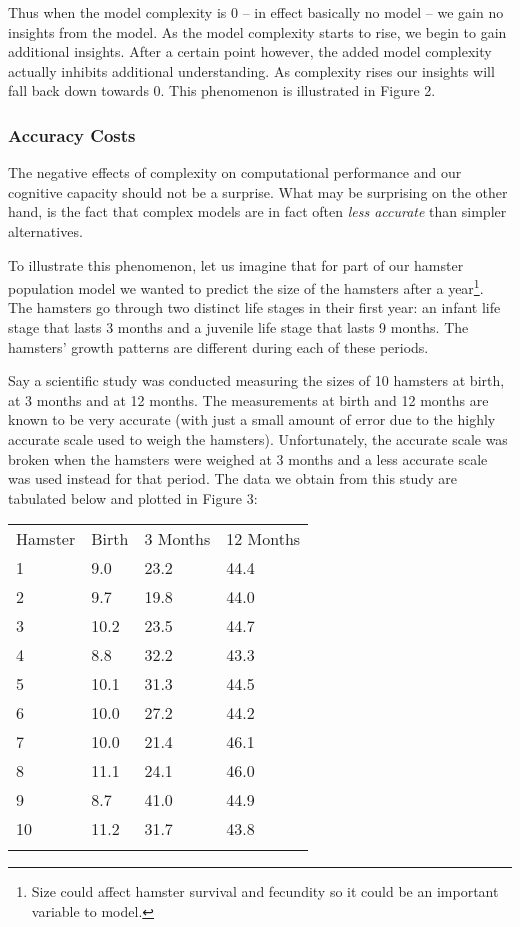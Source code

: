 \documentclass[]{memoir}
\begin{document}
Thus when the model complexity is 0 -- in effect basically no model --
we gain no insights from the model. As the model complexity starts to
rise, we begin to gain additional insights. After a certain point
however, the added model complexity actually inhibits additional
understanding. As complexity rises our insights will fall back down
towards 0. This phenomenon is illustrated in Figure 2.

\subsubsection{Accuracy Costs}

The negative effects of complexity on computational performance and our
cognitive capacity should not be a surprise. What may be surprising on
the other hand, is the fact that complex models are in fact often
\emph{less accurate} than simpler alternatives.

To illustrate this phenomenon, let us imagine that for part of our
hamster population model we wanted to predict the size of the hamsters
after a year\footnote{Size could affect hamster survival and fecundity
  so it could be an important variable to model.}. The hamsters go
through two distinct life stages in their first year: an infant life
stage that lasts 3 months and a juvenile life stage that lasts 9 months.
The hamsters' growth patterns are different during each of these
periods.

Say a scientific study was conducted measuring the sizes of 10 hamsters
at birth, at 3 months and at 12 months. The measurements at birth and 12
months are known to be very accurate (with just a small amount of error
due to the highly accurate scale used to weigh the hamsters).
Unfortunately, the accurate scale was broken when the hamsters were
weighed at 3 months and a less accurate scale was used instead for that
period. The data we obtain from this study are tabulated below and
plotted in Figure 3:

\begin{longtable}[c]{@{}llll@{}}
\hline\noalign{\medskip}
Hamster & Birth & 3 Months & 12 Months
\\\noalign{\medskip}
\hline\noalign{\medskip}
1 & 9.0 & 23.2 & 44.4
\\\noalign{\medskip}
2 & 9.7 & 19.8 & 44.0
\\\noalign{\medskip}
3 & 10.2 & 23.5 & 44.7
\\\noalign{\medskip}
4 & 8.8 & 32.2 & 43.3
\\\noalign{\medskip}
5 & 10.1 & 31.3 & 44.5
\\\noalign{\medskip}
6 & 10.0 & 27.2 & 44.2
\\\noalign{\medskip}
7 & 10.0 & 21.4 & 46.1
\\\noalign{\medskip}
8 & 11.1 & 24.1 & 46.0
\\\noalign{\medskip}
9 & 8.7 & 41.0 & 44.9
\\\noalign{\medskip}
10 & 11.2 & 31.7 & 43.8
\\\noalign{\medskip}
\hline
\end{longtable}
\end{document}
